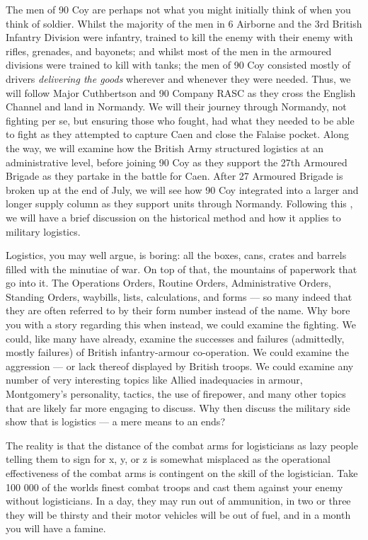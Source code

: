 \documentclass[noraggedright]{turabian-researchpaper}
\begin{document}
The men of 90 Coy are perhaps not what you might initially think of when you
think of soldier.  Whilst the majority of the men in 6 Airborne and the 3rd 
British Infantry Division were infantry, trained to kill the enemy with
their enemy with rifles, grenades, and bayonets; and whilst most of the men in
the armoured divisions were trained to kill with tanks; the men of 90 Coy
consisted mostly of drivers \textit{delivering the goods} wherever and whenever
they were needed.  Thus, we will follow Major Cuthbertson and 90 Company RASC
as they cross the English Channel and land in Normandy.  We will their journey
through Normandy, not fighting per se, but ensuring those who fought, had what
they needed to be able to fight as they attempted to capture Caen and close
the Falaise pocket.  Along the way, we will examine how the British Army
structured logistics at an administrative level, before joining 90 Coy as they
support the 27th Armoured Brigade as they partake in the battle for Caen.  
After 27 Armoured Brigade is broken up at the end of July, we will see how 
90 Coy integrated into a larger and longer supply column as they support units
through Normandy.  Following this , we will have a brief discussion on the 
historical method and how it applies to military logistics.  

Logistics, you may well argue, is boring:  all the boxes, cans, crates and
barrels filled with the minutiae of war.  On top of that, the mountains of
paperwork that go into it.  The Operations Orders, Routine Orders,
Administrative Orders, Standing Orders, waybills, lists, calculations, 
and forms --- so many indeed that they are often referred to by their form 
number instead of the name.  Why bore you with a story regarding this when 
instead, we could examine the fighting.  We could, like many have already,
examine the successes and failures (admittedly, mostly failures) of British
infantry-armour co-operation.  We could examine the aggression --- or lack 
thereof displayed by British troops.  We could examine any number of very
interesting topics like Allied inadequacies in armour, Montgomery's 
personality, tactics, the use of firepower, and many other topics that are
likely far more engaging to discuss.  Why then discuss the military side 
show that is logistics --- a mere means to an ends?  

The reality is that the distance of the combat arms for logisticians as lazy
people telling them to sign for x, y, or z is somewhat misplaced as the 
operational effectiveness of the combat arms is contingent on the skill of
the logistician.  Take 100 000 of the worlds finest combat troops and cast them 
against your enemy without logisticians.  In a day, they may run out of 
ammunition, in two or three they will be thirsty and their motor vehicles
will be out of fuel, and in a month you will have a famine.  
\end{document}
